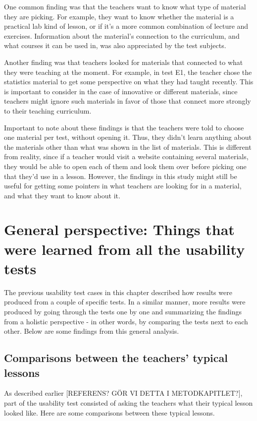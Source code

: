 One common finding was that the teachers want to know what type of material they are picking. For example, they want to know whether the material is a practical lab kind of lesson, or if it's a more common combination of lecture and exercises. Information about the material's connection to the curriculum, and what courses it can be used in, was also appreciated by the test subjects.

Another finding was that teachers looked for materials that connected to what they were teaching at the moment. For example, in test E1, the teacher chose the statistics material to get some perspective on what they had taught recently. This is important to consider in the case of innovative or different materials, since teachers might ignore such materials in favor of those that connect more strongly to their teaching curriculum.

Important to note about these findings is that the teachers were told to choose one material per test, without opening it. Thus, they didn't learn anything about the materials other than what was shown in the list of materials. This is different from reality, since if a teacher would visit a website containing several materials, they would be able to open each of them and look them over before picking one that they'd use in a lesson. However, the findings in this study might still be useful for getting some pointers in what teachers are looking for in a material, and what they want to know about it.

\section{General perspective: Things that were learned from all the usability tests}
The previous usability test cases in this chapter described how results were produced from a couple of specific tests. In a similar manner, more results were produced by going through the tests one by one and summarizing the findings from a holistic perspective - in other words, by comparing the tests next to each other. Below are some findings from this general analysis.

\subsection{Comparisons between the teachers' typical lessons}
As described earlier [REFERENS? GÖR VI DETTA I METODKAPITLET?], part of the usability test consisted of asking the teachers what their typical lesson looked like. Here are some comparisons between these typical lessons.

